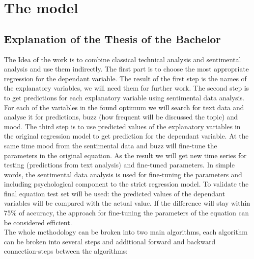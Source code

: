 \documentclass {article}
\begin{document}
\newpage
\section{The model}
\subsection{Explanation of the Thesis of the Bachelor}
The Idea of the work is to combine classical technical analysis and sentimental analysis and use them indirectly. The first part is to choose the most appropriate regression for the dependant variable. The result of the first step is the names of the explanatory variables, we will need them for further work. The second step is to get predictions for each explanatory variable using sentimental data analysis. For each of the variables in the found optimum we will search for text data and analyse it for predictions, buzz (how frequent will be discussed the topic) and mood. The third step is to use predicted values of the explanatory variables in the original regression model to get prediction for the dependant variable. At the same time mood from the sentimental data and buzz will fine-tune the parameters in the original equation. As the result we will get new time series for testing (predictions from text analysis) and fine-tuned parameters. In simple words, the sentimental data analysis is used for fine-tuning the parameters and including psychological component to the strict regression model. To validate the final equation test set will be used: the predicted values of the dependant variables will be compared with the actual value. If the difference will stay within 75\% of accuracy, the approach for fine-tuning the parameters of the equation can be considered efficient.\\
The whole methodology can be broken into two main algorithms, each algorithm can be broken into several steps and additional forward and backward connection-steps between the algorithms:
\end{document}
